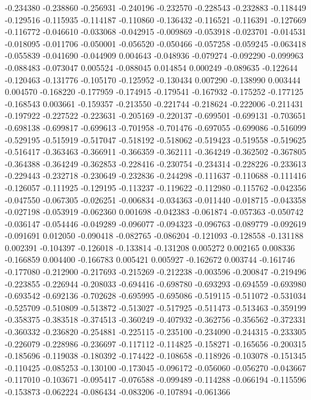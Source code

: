 -0.234380
-0.238860
-0.256931
-0.240196
-0.232570
-0.228543
-0.232883
-0.118449
-0.129516
-0.115935
-0.114187
-0.110860
-0.136432
-0.116521
-0.116391
-0.127669
-0.116772
-0.046610
-0.033068
-0.042915
-0.009869
-0.053918
-0.023701
-0.014531
-0.018095
-0.011706
-0.050001
-0.056520
-0.050466
-0.057258
-0.059245
-0.063418
-0.055839
-0.041690
-0.044909
0.004643
-0.048936
-0.079274
-0.092290
-0.099963
-0.088483
-0.073047
0.005524
-0.088045
0.014854
0.000249
-0.089635
-0.122644
-0.120463
-0.131776
-0.105170
-0.125952
-0.130434
0.007290
-0.138990
0.003444
0.004570
-0.168220
-0.177959
-0.174915
-0.179541
-0.167932
-0.175252
-0.177125
-0.168543
0.003661
-0.159357
-0.213550
-0.221744
-0.218624
-0.222006
-0.211431
-0.197922
-0.227522
-0.223631
-0.205169
-0.220137
-0.699501
-0.699131
-0.703651
-0.698138
-0.699817
-0.699613
-0.701958
-0.701476
-0.697055
-0.699086
-0.516099
-0.529195
-0.515919
-0.517047
-0.518192
-0.518062
-0.519423
-0.519558
-0.519625
-0.516417
-0.363463
-0.366911
-0.366359
-0.362111
-0.364249
-0.362502
-0.367805
-0.364388
-0.364249
-0.362853
-0.228416
-0.230754
-0.234314
-0.228226
-0.233613
-0.229443
-0.232718
-0.230649
-0.232836
-0.244298
-0.111637
-0.110688
-0.111416
-0.126057
-0.111925
-0.129195
-0.113237
-0.119622
-0.112980
-0.115762
-0.042356
-0.047550
-0.067305
-0.026251
-0.006834
-0.034363
-0.011440
-0.018715
-0.043358
-0.027198
-0.053919
-0.062360
0.001698
-0.042383
-0.061874
-0.057363
-0.050742
-0.036147
-0.054446
-0.049289
-0.096077
-0.094323
-0.096763
-0.089779
-0.092619
-0.091691
0.012050
-0.090418
-0.082765
-0.086204
-0.121093
-0.128558
-0.131188
0.002391
-0.104397
-0.126018
-0.133814
-0.131208
0.005272
0.002165
0.008336
-0.166859
0.004400
-0.166783
0.005421
0.005927
-0.162672
0.003744
-0.161746
-0.177080
-0.212900
-0.217693
-0.215269
-0.212238
-0.003596
-0.200847
-0.219496
-0.223855
-0.226944
-0.208033
-0.694416
-0.698780
-0.693293
-0.694559
-0.693980
-0.693542
-0.692136
-0.702628
-0.695995
-0.695086
-0.519115
-0.511072
-0.531034
-0.525709
-0.510809
-0.513872
-0.513027
-0.517925
-0.511473
-0.513463
-0.359199
-0.358375
-0.383518
-0.374513
-0.360249
-0.407932
-0.362756
-0.356562
-0.372331
-0.360332
-0.236820
-0.254881
-0.225115
-0.235100
-0.234090
-0.244315
-0.233305
-0.226079
-0.228986
-0.236697
-0.117112
-0.114825
-0.158271
-0.165656
-0.200315
-0.185696
-0.119038
-0.180392
-0.174422
-0.108658
-0.118926
-0.103078
-0.151345
-0.110425
-0.085253
-0.130100
-0.173045
-0.096172
-0.056060
-0.056270
-0.043667
-0.117010
-0.103671
-0.095417
-0.076588
-0.099489
-0.114288
-0.066194
-0.115596
-0.153873
-0.062224
-0.086434
-0.083206
-0.107894
-0.061366
